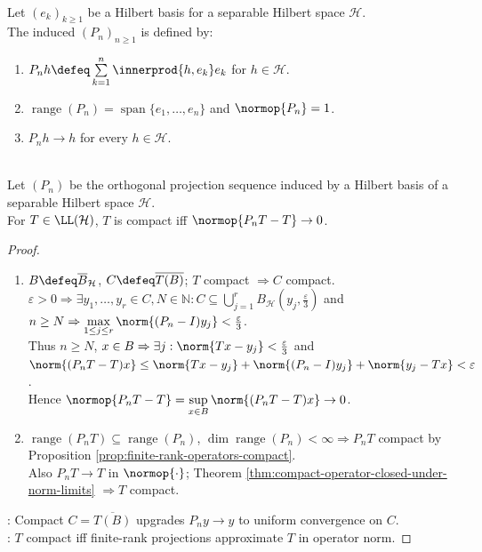 \begin{definition} \label{def:orthogonal-projection-sequence-hilbert-basis} \\
Let $(e_k)_{k\geq1}$ be a Hilbert basis for a separable Hilbert space $\mathcal{H}$.\\
The induced  $(P_n)_{n\geq1}$ is defined by:
\begin{enumerate}[label=(\roman*)]
\setlength{\itemsep}{0pt}
\item $P_nh\defeq\sum\limits_{k=1}^{n}\innerprod{h,e_k}e_k$ for $h\in\mathcal{H}$.
\item $\operatorname{range}(P_n)=\operatorname{span}\{e_1,\ldots,e_n\}$ and $\normop{P_n}=1$.
\item $P_nh\to h$ for every $h\in\mathcal{H}$.
\end{enumerate}
\end{definition}

\begin{proposition} \label{prop:compact-operators-finite-rank-projection-approximation} \\
Let $(P_n)$ be the orthogonal projection sequence induced by a Hilbert basis of a separable Hilbert space $\mathcal{H}$.\\
For $T\in\LL(\mathcal{H})$, $T$ is compact iff $\normop{P_nT-T}\to0$.
\begin{proof}
\begin{enumerate}[label=\roman*.]
\setlength{\itemsep}{0pt}
\item[$(\Rightarrow)$] $B\defeq\overline{B}_{\mathcal{H}}$, $C\defeq\overline{T(B)}$; $T$ compact $\Rightarrow C$ compact.\\
$\varepsilon>0\Rightarrow\exists y_1,\ldots,y_r\in C,N\in\mathbb{N}:C\subseteq\bigcup\limits_{j=1}^r B_{\mathcal{H}}(y_j,\frac{\varepsilon}{3})$ and $n\geq N\Rightarrow\max\limits_{1\leq j\leq r}\norm{(P_n-I)y_j}<\frac{\varepsilon}{3}$.\\
Thus $n\geq N$, $x\in B\Rightarrow\exists j:\norm{Tx-y_j}<\frac{\varepsilon}{3}$ and $\norm{(P_nT-T)x}\leq\norm{Tx-y_j}+\norm{(P_n-I)y_j}+\norm{y_j-Tx}<\varepsilon$.\\
Hence $\normop{P_nT-T}=\sup\limits_{x\in B}\norm{(P_nT-T)x}\to0$.
\item[$(\Leftarrow)$] $\operatorname{range}(P_nT)\subseteq\operatorname{range}(P_n)$, $\dim\operatorname{range}(P_n)<\infty\Rightarrow P_nT$ compact by Proposition \ref{prop:finite-rank-operators-compact}.\\
Also $P_nT\to T$ in $\normop{\cdot}$; Theorem \ref{thm:compact-operator-closed-under-norm-limits} $\Rightarrow T$ compact.
\end{enumerate}
: Compact $C=\overline{T(B)}$ upgrades $P_ny\to y$ to uniform convergence on $C$.\\
: $T$ compact iff finite-rank projections approximate $T$ in operator norm.
\end{proof}
\end{proposition}

